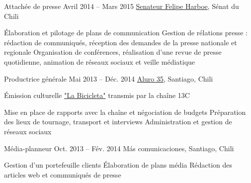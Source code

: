 \begin{joblist}
{{\begin{itemize}
		\end{itemize}      
        }
	}



\item[Attachée de presse]{Avril 2014 -- Mars 2015}
     {
     \href{https://www.harboe.cl/}{Senateur Felipe Harboe}, Sénat du Chili
     } 
	 {
        \normalsize{
		\iftbftiny \vspace{-0.5cm} \fi
			\begin{itemize}
			  \iftbftiny \setlength\itemsep{-3pt} \fi
			  \cvitem[\checkmark] Élaboration et pilotage de plans de communication
			  \cvitem[\checkmark] Gestion de rélations presse : rédaction de communiqués, réception des demandes de la presse nationale et regionale
			  \cvitem[\checkmark] Organisation de conférences, réalisation d'une revue de presse quotidienne, animation de réseaux sociaux et veille médiatique
			\end{itemize}     
		}	
	}
    
    
    
\item[Productrice générale]{Mai 2013 -- Déc. 2014}
     {
     \href{https://www.aluro35.com/}{Aluro 35}, Santiago, Chili
     }
     {Émission culturelle \href{http://www.13.cl/c/programas/la-bicicleta}{"La Bicicleta"} transmis par la chaîne 13C \\

        \normalsize{
		\iftbftiny \vspace{-0.5cm} \fi
			\begin{itemize}
			  \iftbftiny \setlength\itemsep{-3pt} \fi
			  \cvitem[\checkmark] Mise en place de rapports avec la chaîne et négociation de budgets                       
			  \cvitem[\checkmark] Préparation des lieux de tournage, transport et interviews
			  \cvitem[\checkmark] Administration et gestion de réseaux sociaux
			\end{itemize}     
		}	
	}



\item[Média-planneur]{Oct. 2013 -- Fév. 2014 }     
  	{
  	Más comunicaciones, Santiago, Chili
  	}     
  	{
        \normalsize{
		\iftbftiny \vspace{-0.5cm} \fi
		\begin{itemize}
			  \iftbftiny \setlength\itemsep{-3pt} \fi
			  \cvitem[\checkmark]  Gestion d'un portefeuille clients                                    
			  \cvitem[\checkmark]  Élaboration de plans média                                    
			  \cvitem[\checkmark]  Rédaction des articles web et communiqués de presse
			  

\end{itemize}}}
\end{joblist}
